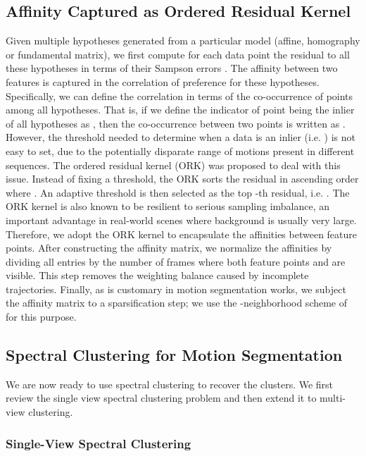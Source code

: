 \documentclass[10pt,twocolumn,letterpaper]{article}
\begin{document}
\subsection{Affinity Captured as Ordered Residual Kernel}

Given multiple hypotheses  generated from a particular model (affine, homography or fundamental matrix), we first compute for each data point the residual to all these hypotheses  in terms of their Sampson errors \cite{hartley2003multiple}. The affinity between two features is captured in the correlation of preference for these hypotheses. Specifically, we can define the correlation in terms of the co-occurrence of points among all hypotheses. That is, if we define the indicator of point  being the inlier of all hypotheses  as , then the co-occurrence between two points is written as . 
However, the threshold  needed to determine when a data is an inlier (i.e. ) is not easy to set, due to the potentially disparate range of motions present in different sequences.
The ordered residual kernel (ORK) \cite{Chin2009,Lai2017} was proposed to deal with this issue. Instead of fixing a threshold, the ORK sorts the residual in ascending order  where . An adaptive threshold is then selected as the top -th residual, i.e. . The ORK kernel is also known to be resilient to serious sampling imbalance, an important advantage in real-world scenes where background is usually very large. Therefore, we adopt the ORK kernel to encapsulate the affinities between feature points. After constructing the affinity matrix, we normalize the affinities by dividing all  entries by the number of frames where both feature points  and  are visible. This step removes the weighting balance caused by incomplete trajectories. 
Finally, as is customary in motion segmentation works, we subject the affinity matrix to a sparsification step; we use the -neighborhood scheme of \cite{Lai2017} for this purpose.

\subsection{Spectral Clustering for Motion Segmentation}

We are now ready to use spectral clustering to recover the
clusters. We first review the single view spectral clustering
problem and then extend it to multi-view clustering.

\vspace{-0.2cm}
\subsubsection{Single-View Spectral Clustering}
\end{document}
